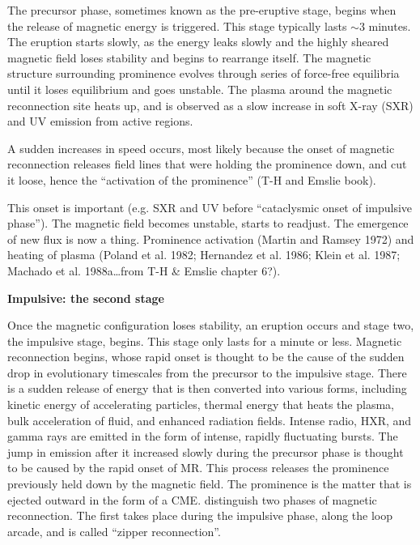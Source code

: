 The precursor phase, sometimes known as the pre-eruptive stage,
begins when the release of magnetic energy is triggered.
This stage typically lasts $\sim$3 minutes.
The eruption starts slowly, as
the energy leaks slowly and the
highly sheared magnetic field loses
stability and begins to rearrange itself.
The magnetic
structure surrounding prominence evolves through series of force-free
equilibria until it loses equilibrium and goes unstable.
The plasma around the magnetic reconnection site heats up,
and is observed as a
slow increase in soft X-ray (SXR) and UV emission from active regions.

A sudden increases in speed occurs,
most likely because the onset of magnetic
reconnection releases field lines that were holding the prominence down,
and cut it loose, hence the
``activation of the prominence'' (T-H and Emslie book).


This onset is important (e.g. SXR and UV before ``cataclysmic onset of impulsive
phase''). The magnetic field becomes unstable, starts to readjust. The emergence
of new flux is now a thing. Prominence activation (Martin and Ramsey 1972) and
heating of plasma (Poland et al. 1982; Hernandez et al. 1986; Klein et al.
1987; Machado et al. 1988a\ldots from T-H \& Emslie chapter 6?).

\textbf{Impulsive: the second stage}\quad

Once the magnetic configuration loses stability, an eruption occurs and stage
two, the impulsive stage, begins. This stage only lasts for a minute or less.
Magnetic reconnection begins, whose rapid onset is thought to be the cause of
the sudden drop in evolutionary timescales from the precursor to the impulsive
stage. There is a sudden release of energy that is then converted into various
forms, including kinetic energy of accelerating particles, thermal energy that
heats the plasma, bulk acceleration of fluid, and enhanced radiation fields.
Intense radio, HXR, and gamma rays are emitted in the form of intense, rapidly
fluctuating bursts. The jump in emission after it increased slowly during the
precursor phase is thought to be caused by the rapid onset of MR. This process
releases the prominence previously held down by the magnetic field. The
prominence is the matter that is ejected outward in the form of a CME.
\cite{Priest2017}
distinguish two phases of magnetic reconnection. The first
takes place during the impulsive phase, along the loop arcade, and is called
``zipper reconnection''.

